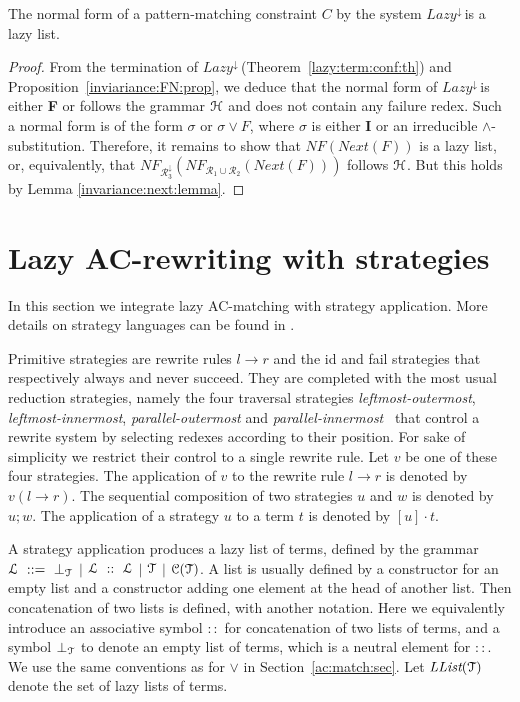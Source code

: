 \documentclass[submission,copyright,creativecommons]{eptcs}
\newcommand \rrule[2]{#1\rightarrow #2}
\newcommand \lazy{$\textit{Lazy}^{\downarrow}\,$}
\newcommand \Ronetwo{\ensuremath{\mathcal{R}_1\cup\mathcal{R}_2}}
\newcommand \Rthree{\ensuremath{\mathcal{R}_3^{\downarrow}}}
\newcommand \llist[1]{\ensuremath{\textit{LList}(#1)}}
\newcommand \Eu[1]{\EuScript{#1}}
\numberwithin{subcase}{case}
\begin{document}
\begin{theorem}
\label{NF:theorem}
The normal form of a pattern-matching constraint $C$ by the system 
 \lazy  is a lazy list.
\end{theorem}
\begin{proof}
From  the termination of \lazy (Theorem~\ref{lazy:term:conf:th}) and
Proposition~\ref{inviariance:FN:prop}, we deduce that the normal form of \lazy is
either \textbf{F} or  follows the grammar $\Eu{H}$ and does not contain any
failure redex. Such a normal form is of the form $\sigma$ or $\sigma \lor F$,
where $\sigma$ is either \textbf{I} or an irreducible $\land$-substitution.
Therefore, it remains to show that $\textit{NF}(Next(F))$ is a lazy list,
or, equivalently, that $\textit{NF}_{\Rthree}(\textit{NF}_{\Ronetwo}(Next(F)))$ follows $\Eu{H}$.
But this holds by Lemma \ref{invariance:next:lemma}.
\end{proof}


\section{Lazy AC-rewriting with strategies}
\label{lazy:rewriting:sec}

In this section we integrate lazy AC-matching with strategy application.   
More details on strategy languages can be found in 
\cite{BKKR-IJFCS-2001,Vis01-rta,Marti-OlietMV05}.

 
Primitive strategies are rewrite rules $\rrule{l}{r}$ and the
\textsf{id} and \textsf{fail} strategies that respectively always and
never succeed. They are completed with the most
usual reduction strategies, namely the four traversal strategies
\textit{leftmost-outermost}, \textit{leftmost-innermost},
\textit{parallel-outermost} and \textit{parallel-innermost}~\cite[Definition
4.9.5]{Terese03} that control a rewrite system by selecting redexes according to
their position. For sake of simplicity we restrict their control to a single
rewrite rule. Let $v$ be one of these four strategies. The application of $v$ to
the rewrite rule $\rrule{l}{r}$ is denoted by $v(\rrule{l}{r})$. 
The sequential composition of two strategies $u$ and $w$ is denoted by $u;w$.
The application of a strategy $u$ to a term $t$ is denoted by $[u] \cdot t$.



A strategy application produces a lazy list of terms, defined by the grammar
$\Eu{L}~::=~\bot_{\EuScript{T}}$ $|$ $\Eu{L}~::~\Eu{L}$ $|$
$\Eu{T}$ $|$ $\Eu{C}(\Eu{T})$.
 A list is usually defined by a constructor for an empty list and a constructor
adding one element at the head of another list. Then concatenation of two
lists is defined, with another notation. Here we equivalently introduce an
associative symbol $::$ for concatenation of two lists of terms, and a symbol
$\bot_{\EuScript{T}}$ to denote an empty list of terms, which is a neutral
element for $::$. We use the same conventions as for $\lor$ in
Section~\ref{ac:match:sec}. Let $\llist{\EuScript{T}}$ denote the set of lazy
lists of terms.
\end{document}
